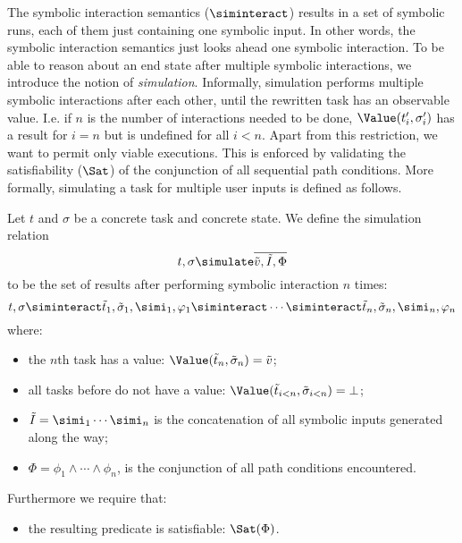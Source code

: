 The symbolic interaction semantics ($\siminteract$) results in a set of symbolic runs, each of them just containing one symbolic input.
In other words, the symbolic interaction semantics just looks ahead one symbolic interaction.
To be able to reason about an end state after multiple symbolic interactions,
we introduce the notion of \emph{simulation}.
Informally, simulation performs multiple symbolic interactions after each other,
until the rewritten task has an observable value.
I.e. if $n$ is the number of interactions needed to be done,
$\Value(t_i', \sigma_i')$ has a result for $i = n$ but is undefined for all $i < n$.
Apart from this restriction, we want to permit only viable executions.
This is enforced by validating the satisfiability ($\Sat$) of the conjunction of all sequential path conditions.
More formally, simulating a task for multiple user inputs is defined as follows.

\begin{definition}
  \label{def:simulation}
  Let $t$ and $\sigma$ be a concrete task and concrete state.
  We define the simulation relation
  \begin{equation*}
    t,\sigma \simulate \overline{\tilde{v},\tilde{I},\Phi}
  \end{equation*}
  to be the set of results after performing symbolic interaction $n$ times:
  \begin{equation*}
      t,\sigma
        \siminteract \tilde{t}_1,\tilde{\sigma}_1,\simi_1,\phi_1
        \siminteract \cdots
        \siminteract \tilde{t}_n,\tilde{\sigma}_n,\simi_n,\phi_n
  \end{equation*}
  where:
  \begin{itemize}
    \item the $n$th task has a value: $\Value(\tilde{t}_n,\tilde{\sigma}_n) = \tilde{v}$;
    \item all tasks before do not have a value: $\Value(\tilde{t}_{i<n},\tilde{\sigma}_{i<n}) = \bot$;
    \item $\tilde{I} = \simi_1 \cdots \simi_n$ is the concatenation of all symbolic inputs generated along the way;
    \item $\Phi = \phi_1 \land \cdots \land \phi_n$, is the conjunction of all path conditions encountered.
  \end{itemize}
  Furthermore we require that:
  \begin{itemize}
    \item the resulting predicate is satisfiable: $\Sat(\Phi)$.
  \end{itemize}
\end{definition}

